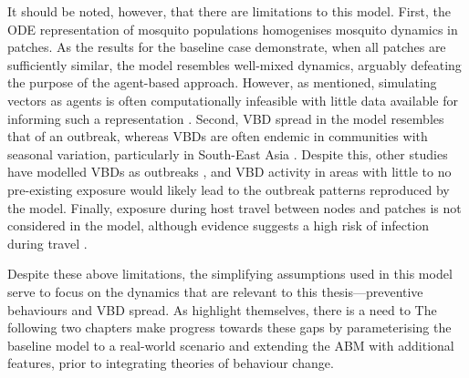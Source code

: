 It should be noted, however, that there are limitations to this model. First, the ODE representation of mosquito populations homogenises mosquito dynamics in patches. As the results for the baseline case demonstrate, when all patches are sufficiently similar, the model resembles well-mixed dynamics, arguably defeating the purpose of the agent-based approach. However, as mentioned, simulating vectors as agents is often computationally infeasible with little data available for informing such a representation \cite{jacintho_agent-based_2010, maneerat_spatial_2016, de_mooij_framework_2023}. Second, VBD spread in the model resembles that of an outbreak, whereas VBDs are often endemic in communities with seasonal variation, particularly in South-East Asia \cite{bhatia_vector-borne_2014}. Despite this, other studies have modelled VBDs as outbreaks \cite{tabares_comparing_2024}, and VBD activity in areas with little to no pre-existing exposure would likely lead to the outbreak patterns reproduced by the model. Finally, exposure during host travel between nodes and patches is not considered in the model, although evidence suggests a high risk of infection during travel \cite{pepey_mobility_2022, sandfort_forest_2020}.

Despite these above limitations, the simplifying assumptions used in this model serve to focus on the dynamics that are relevant to this thesis---preventive behaviours and VBD spread. As \citet{manore_network-patch_2015} highlight themselves, there is a need to  The following two chapters make progress towards these gaps by parameterising the baseline model to a real-world scenario and extending the ABM with additional features, prior to integrating theories of behaviour change.